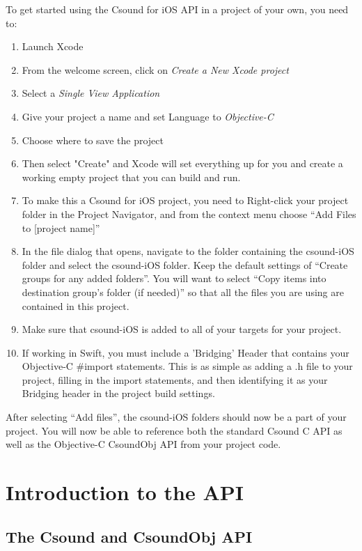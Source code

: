 \documentclass[11pt]{article}
\begin{document}
To get started using the Csound for iOS API in a project of your own, you need to:
 
\begin{enumerate}
\item Launch Xcode
\item From the welcome screen, click on \textit{Create a New Xcode project}
\item Select a \textit{Single View Application}
\item Give your project a name and set Language to \textit{Objective-C}
\item Choose where to save the project
\item Then select "Create" and Xcode will set everything up for you and create a working empty project that you can build and run.
\item To make this a Csound for iOS project, you need to Right-click your project folder in the Project Navigator, and from the context menu choose ``Add Files to [project name]''
\item In the file dialog that opens, navigate to the folder containing the csound-iOS folder and select the csound-iOS folder. Keep the default settings of ``Create groups for any added folders''.  You will want to select ``Copy items into destination group's folder (if needed)'' so that all the files you are using are contained in this project.
\item Make sure that csound-iOS is added to all of your targets for your project.
\item If working in Swift, you must include a 'Bridging' Header that contains your Objective-C \#import statements. This is as simple as adding a .h file to your project, filling in the import statements, and then identifying it as your Bridging header in the project build settings.
\end{enumerate}

After selecting ``Add files'', the csound-iOS folders should now be a part of your project.  You will now be able to reference both the standard Csound C API as well as the Objective-C CsoundObj API from your project code.


\section{Introduction to the API}
\subsection{The Csound and CsoundObj API}
\end{document}
